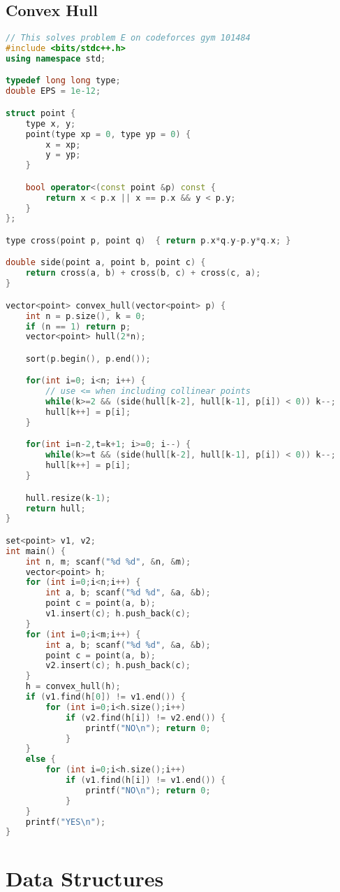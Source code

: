 \documentclass{article}
\begin{document}
\subsection{Convex Hull}
\begin{lstlisting}[language=C++]
// This solves problem E on codeforces gym 101484
#include <bits/stdc++.h>
using namespace std;

typedef long long type;
double EPS = 1e-12;

struct point {
    type x, y;
    point(type xp = 0, type yp = 0) {
        x = xp;
        y = yp;
    }

    bool operator<(const point &p) const {
		return x < p.x || x == p.x && y < p.y;
	}
};

type cross(point p, point q)  { return p.x*q.y-p.y*q.x; }

double side(point a, point b, point c) {
    return cross(a, b) + cross(b, c) + cross(c, a);
}

vector<point> convex_hull(vector<point> p) {
    int n = p.size(), k = 0;
    if (n == 1) return p;
    vector<point> hull(2*n);

    sort(p.begin(), p.end());

    for(int i=0; i<n; i++) {
		// use <= when including collinear points
        while(k>=2 && (side(hull[k-2], hull[k-1], p[i]) < 0)) k--;
        hull[k++] = p[i];
    }

    for(int i=n-2,t=k+1; i>=0; i--) {
        while(k>=t && (side(hull[k-2], hull[k-1], p[i]) < 0)) k--;
        hull[k++] = p[i];
    }

    hull.resize(k-1);
    return hull;
}

set<point> v1, v2;
int main() {
	int n, m; scanf("%d %d", &n, &m);
	vector<point> h;
	for (int i=0;i<n;i++) {
		int a, b; scanf("%d %d", &a, &b);
		point c = point(a, b);
		v1.insert(c); h.push_back(c);
	}
	for (int i=0;i<m;i++) {
		int a, b; scanf("%d %d", &a, &b);
		point c = point(a, b);
		v2.insert(c); h.push_back(c);
	}
	h = convex_hull(h);
	if (v1.find(h[0]) != v1.end()) {
		for (int i=0;i<h.size();i++)
			if (v2.find(h[i]) != v2.end()) {
				printf("NO\n"); return 0;
			}
	}
	else {
		for (int i=0;i<h.size();i++)
			if (v1.find(h[i]) != v1.end()) {
				printf("NO\n"); return 0;
			}
	}
	printf("YES\n");
}
\end{lstlisting}
\section{Data Structures}
\end{document}
